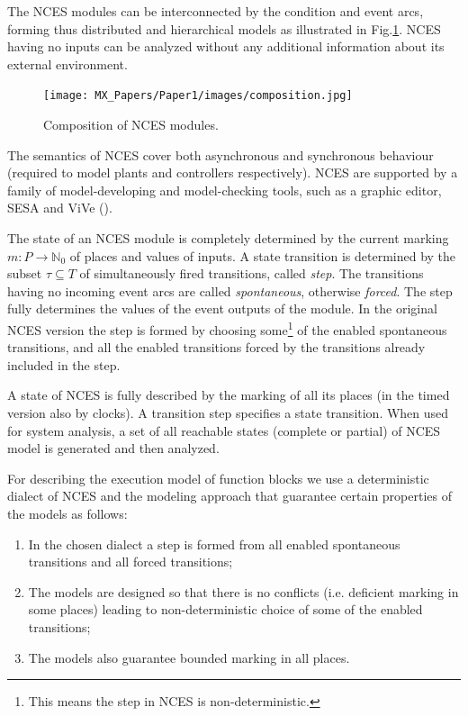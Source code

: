 \begin{bibunit}
The NCES modules can be interconnected by the condition and event arcs, forming thus distributed and hierarchical models as illustrated in Fig.\ref{fig:composition}.
NCES having no inputs can be analyzed without any additional
information about its external environment.

\begin{figure}
    \centering
    \texttt{[image: MX\_Papers/Paper1/images/composition.jpg]}
    \caption{Composition of NCES modules.}
    \label{fig:composition}
\end{figure}

The semantics of NCES cover both asynchronous and synchronous behaviour (required to model plants and controllers respectively). NCES are supported by a family of model-developing and model-checking tools, such as a graphic editor, SESA and ViVe (\cite{vive}).

The state of an NCES module is completely determined by the
current marking $m: P \rightarrow \mathbb{N}_0$ of places and values of
inputs. A state transition is determined by the subset $\tau
\subseteq T$ of simultaneously fired transitions, called {\it
step}. The transitions having no incoming event arcs are called
{\it spontaneous}, otherwise {\it forced}. The step fully determines the
values of the event outputs of the module. In the original NCES version the step is formed by
choosing some\footnote{This means the step in NCES is non-deterministic.} of the enabled spontaneous transitions, and all the enabled transitions forced by the transitions already included in the step. 

A state of NCES is fully described by the marking of all its places (in the timed version also by clocks). A transition step specifies a state transition. 
When used for system analysis, a set of all reachable states (complete or partial) 
of NCES model is generated and then analyzed.

For describing the execution model of function blocks we use a deterministic dialect 
of NCES and the modeling approach that guarantee certain properties of the models as follows: 
\begin{enumerate}
\item In the chosen dialect a step is formed from all enabled spontaneous transitions and all forced transitions;
\item The models are designed so that there is no conflicts (i.e. deficient marking in some places) leading to non-deterministic choice of some of the enabled transitions;
\item The models also guarantee bounded marking in all places.
\end{enumerate}


\end{bibunit}
